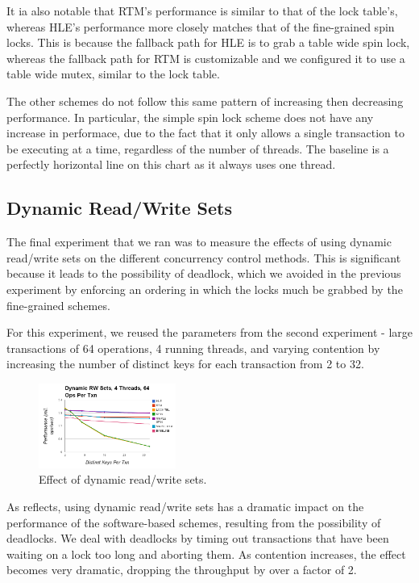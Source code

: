 It ia also notable that RTM's performance is similar to that of the lock table's, 
whereas HLE's performance more closely matches that of the fine-grained spin locks. 
This is because the fallback path for HLE is to grab a table wide spin lock, whereas 
the fallback path for RTM is customizable and we configured it to use a table wide 
mutex, similar to the lock table.

The other schemes do not follow this same pattern of increasing then decreasing 
performance. In particular, the simple spin lock scheme does not have any increase 
in performace, due to the fact that it only allows a single transaction to be 
executing at a time, regardless of the number of threads. The baseline is a 
perfectly horizontal line on this chart as it always uses one thread.

\subsection{Dynamic Read/Write Sets}

The final experiment that we ran was to measure the effects of using dynamic 
read/write sets on the different concurrency control methods. This is 
significant because it leads to the possibility of deadlock, which we avoided 
in the previous experiment by enforcing an ordering in which the locks much 
be grabbed by the fine-grained schemes.

For this experiment, we reused the parameters from the second experiment - 
large transactions of 64 operations, 4 running threads, and varying 
contention by increasing the number of distinct keys for each transaction 
from 2 to 32.

\begin{figure}[h!]
  \centering
  \includegraphics[width=0.4\textwidth]{figure/dynamic.png}
  \caption{Effect of dynamic read/write sets.}
  \label{fig:dynamic} 
\end{figure}

As  reflects, using dynamic read/write sets has a dramatic 
impact on the performance of the software-based schemes, resulting from the 
possibility of deadlocks. We deal with deadlocks by timing out transactions 
that have been waiting on a lock too long and aborting them. As contention 
increases, the effect becomes very dramatic, dropping the throughput by over 
a factor of 2.

